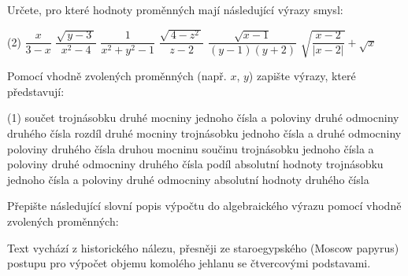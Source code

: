 \documentclass[12pt,a4paper]{article}
\begin{document}


\exercisepart
\setcounter{section}{1}


\begin{exercise}
    Určete, pro které hodnoty proměnných mají následující výrazy smysl:
    \begin{tasks}(2)
        \task $\dfrac{x}{3-x}$
        \task $\dfrac{\sqrt{\,y-3\,}}{x^2 - 4}$
        \task $\dfrac{1}{x^2+y^2-1}$
        \task $\dfrac{\sqrt{\,4-z^2\,}}{z-2}$
        \task $\dfrac{\sqrt{x-1}}{\left(y-1\right)\left(y+2\right)}$
        \task $\sqrt{\dfrac{x-2}{|x-2|}} + \sqrt{x}$
    \end{tasks}
\end{exercise}


\begin{exercise}
    Pomocí vhodně zvolených proměnných (např. $x$, $y$) zapište výrazy, které představují:
    \begin{tasks}(1)
        \task součet trojnásobku druhé mocniny jednoho čísla a poloviny druhé odmocniny druhého čísla
        \task rozdíl druhé mocniny trojnásobku jednoho čísla a druhé odmocniny poloviny druhého čísla
        \task druhou mocninu součinu trojnásobku jednoho čísla a poloviny druhé odmocniny druhého čísla
        \task podíl absolutní hodnoty trojnásobku jednoho čísla a poloviny druhé odmocniny absolutní hodnoty druhého čísla
    \end{tasks}
\end{exercise}


\begin{exercise}
    Přepište následující slovní popis výpočtu do algebraického výrazu pomocí vhodně zvolených proměnných:

    \smallskip
    \emph{}

    \smallskip
    Text vychází z historického nálezu, přesněji ze staroegypského (Moscow papyrus) postupu pro výpočet objemu komolého jehlanu se čtvercovými podstavami.
\end{exercise}
\end{document}
